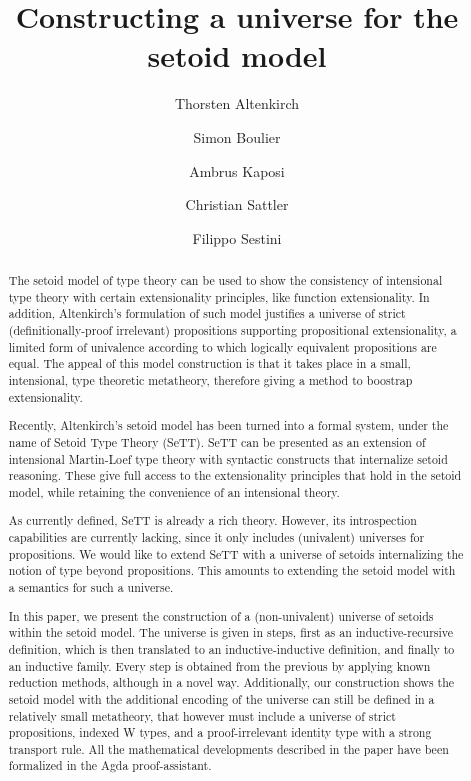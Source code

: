 \documentclass[a4paper,UKenglish,cleveref, autoref, thm-restate]{lipics-v2019}
\title{Constructing a universe for the setoid model}
\author{Thorsten Altenkirch}{School of Computer Science, University of Nottingham, UK}{psztxa@nottingham.ac.uk}{https://orcid.org/0000-0002-6582-5025}{Supported by USAF grant FA9550-16-1-0029.}
\author{Simon Boulier}{Inria, Nantes, France}{simon.boulier@inria.fr}{}{}
\author{Ambrus Kaposi}{E{\"o}tv{\"o}s Lor{\'a}nd University, Budapest, Hungary}{akaposi@inf.elte.hu}{https://orcid.org/0000-0001-9897-8936}{Supported by the National Research, Development and Innovation Fund of Hungary, financed under the Thematic Excellence Programme funding scheme, Project no. ED\_18-1-2019-0030 and the Bolyai Fellowship of the Hungarian Academy of Sciences, Project no.\ BO/00659/19/3.}
\author{Christian Sattler}{Chalmers University of Technology, Gothenburg, Sweden}{sattler@chalmers.se}{}{Supported by USAF grant FA9550-16-1-0029 and Swedish Research Council grant 2019-03765.}
\author{Filippo Sestini}{School of Computer Science, University of Nottingham, UK}{Filippo.Sestini@nottingham.ac.uk}{}{}
\begin{document}
\maketitle

\begin{abstract}
The setoid model of type theory can be used to show the consistency of
intensional type theory with certain extensionality principles, like function
extensionality. In addition, Altenkirch's formulation of such model justifies a
universe of strict (definitionally-proof irrelevant) propositions supporting
propositional extensionality, a limited form of univalence according to which
logically equivalent propositions are equal. The appeal of this model
construction is that it takes place in a small, intensional, type theoretic
metatheory, therefore giving a method to boostrap extensionality.

Recently, Altenkirch's setoid model has been turned into a formal system, under
the name of Setoid Type Theory (SeTT). SeTT can be presented as an extension of
intensional Martin-Loef type theory with syntactic constructs that internalize
setoid reasoning. These give full access to the extensionality principles that
hold in the setoid model, while retaining the convenience of an intensional
theory.

As currently defined, SeTT is already a rich theory. However, its introspection
capabilities are currently lacking, since it only includes (univalent) universes
for propositions. We would like to extend SeTT with a universe of setoids
internalizing the notion of type beyond propositions. This amounts to extending
the setoid model with a semantics for such a universe.

In this paper, we present the construction of a (non-univalent) universe of
setoids within the setoid model. The universe is given in steps, first as an
inductive-recursive definition, which is then translated to an
inductive-inductive definition, and finally to an inductive family. Every step
is obtained from the previous by applying known reduction methods, although in a
novel way. Additionally, our construction shows the setoid model with the
additional encoding of the universe can still be defined in a relatively small
metatheory, that however must include a universe of strict propositions, indexed
W types, and a proof-irrelevant identity type with a strong transport rule. All
the mathematical developments described in the paper have been formalized in the
Agda proof-assistant.
\end{abstract}
\end{document}
